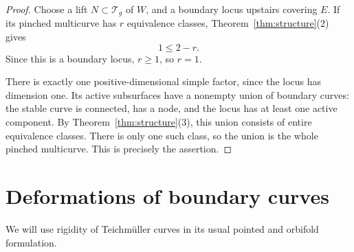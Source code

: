 \documentclass[11pt]{article}
\newcommand{\T}{\mathcal T}
\theoremstyle{remark}
\begin{document}

\begin{proof}
Choose a lift \(N\subset\T_g\) of \(W\), and a boundary locus
upstairs covering \(E\). If its pinched multicurve has \(r\)
equivalence classes, Theorem~\ref{thm:structure}(2) gives
\[
1\leq 2-r.
\]
Since this is a boundary locus, \(r\geq1\), so \(r=1\).

There is exactly one positive-dimensional simple factor, since
the locus has dimension one. Its active subsurfaces have a
nonempty union of boundary curves: the stable curve is connected,
has a node, and the locus has at least one active component.
By Theorem~\ref{thm:structure}(3), this union consists of entire
equivalence classes. There is only one such class, so the union
is the whole pinched multicurve. This is precisely the assertion.
\end{proof}


\section{Deformations of boundary curves}

We will use rigidity of Teichm\"uller curves in its usual
pointed and orbifold formulation.
\end{document}
